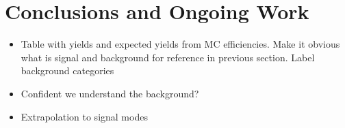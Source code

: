 \documentclass[oneside,12pt]{article}
\begin{document}
\section{Conclusions and Ongoing Work} \label{sec:conclusion}
\begin{itemize}
\item Table with yields and expected yields from MC efficiencies. Make it
obvious what is signal and background for reference in previous section. Label
background categories
\item Confident we understand the background?
\item Extrapolation to signal modes
\end{itemize}

\printbibliography[heading=bibintoc,{title=References}]
\end{document}
